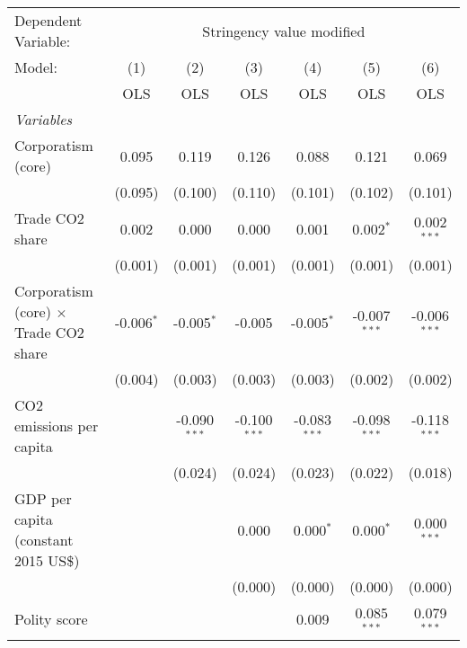 
\begingroup
\centering
\begin{tabular}{lcccccc}
   \toprule
   Dependent Variable: & \multicolumn{6}{c}{Stringency value modified}\\
   Model:                                       & (1)          & (2)            & (3)            & (4)            & (5)            & (6)\\  
                                                &  OLS         & OLS            & OLS            & OLS            & OLS            & OLS\\  
   \midrule
   \emph{Variables}\\
   Corporatism (core)                           & 0.095        & 0.119          & 0.126          & 0.088          & 0.121          & 0.069\\   
                                                & (0.095)      & (0.100)        & (0.110)        & (0.101)        & (0.102)        & (0.101)\\   
   Trade CO2 share                              & 0.002        & 0.000          & 0.000          & 0.001          & 0.002$^{*}$    & 0.002$^{***}$\\   
                                                & (0.001)      & (0.001)        & (0.001)        & (0.001)        & (0.001)        & (0.001)\\   
   Corporatism (core) $\times$ Trade CO2 share  & -0.006$^{*}$ & -0.005$^{*}$   & -0.005         & -0.005$^{*}$   & -0.007$^{***}$ & -0.006$^{***}$\\   
                                                & (0.004)      & (0.003)        & (0.003)        & (0.003)        & (0.002)        & (0.002)\\   
   CO2 emissions per capita                     &              & -0.090$^{***}$ & -0.100$^{***}$ & -0.083$^{***}$ & -0.098$^{***}$ & -0.118$^{***}$\\   
                                                &              & (0.024)        & (0.024)        & (0.023)        & (0.022)        & (0.018)\\   
   GDP per capita (constant 2015 US\$)          &              &                & 0.000          & 0.000$^{*}$    & 0.000$^{*}$    & 0.000$^{***}$\\   
                                                &              &                & (0.000)        & (0.000)        & (0.000)        & (0.000)\\   
   Polity score                                 &              &                &                & 0.009          & 0.085$^{***}$  & 0.079$^{***}$\\   

\end{tabular}
